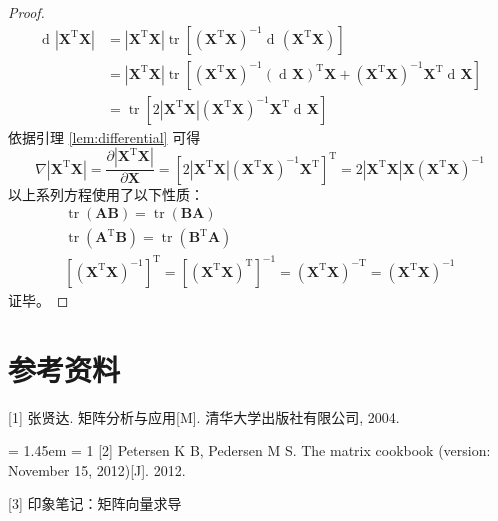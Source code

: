 \documentclass[UTF8,space=auto]{ctexart} %
\DeclareMathOperator{\diff}{d\!}
\begin{document}
\begin{proof}
\begin{align*}
	\diff \left| \mathbf{X}^{\mathrm{T}}\mathbf{X} \right|
	&= \left| \mathbf{X}^{\mathrm{T}}\mathbf{X} \right| \operatorname{tr} \left[ \left( \mathbf{X}^{\mathrm{T}}\mathbf{X} \right)^{-1} \diff\left( \mathbf{X}^{\mathrm{T}}\mathbf{X} \right) \right] \\
	&= \left| \mathbf{X}^{\mathrm{T}}\mathbf{X} \right| \operatorname{tr} \left[ \left( \mathbf{X}^{\mathrm{T}}\mathbf{X} \right)^{-1} \left(\diff\mathbf{X}\right)^{\mathrm{T}} \mathbf{X} + \left( \mathbf{X}^{\mathrm{T}}\mathbf{X} \right)^{-1} \mathbf{X}^{\mathrm{T}} \diff\mathbf{X} \right] \\
	&= \operatorname{tr} \left[ 2\left| \mathbf{X}^{\mathrm{T}}\mathbf{X} \right| \left( \mathbf{X}^{\mathrm{T}}\mathbf{X} \right)^{-1} \mathbf{X}^{\mathrm{T}} \diff\mathbf{X} \right]
\end{align*}
依据引理 \ref{lem:differential} 可得
\[
\nabla \left| \mathbf{X}^{\mathrm{T}}\mathbf{X} \right|
= \frac{\partial\left|\mathbf{X}^{\mathrm{T}} \mathbf{X}\right|}{\partial \mathbf{X}}
= \left[ 2\left| \mathbf{X}^{\mathrm{T}}\mathbf{X} \right| \left( \mathbf{X}^{\mathrm{T}}\mathbf{X} \right)^{-1} \mathbf{X}^{\mathrm{T}} \right]^{\mathrm{T}}
=2\left|\mathbf{X}^{\mathrm{T}} \mathbf{X}\right| \mathbf{X}\left(\mathbf{X}^{\mathrm{T}} \mathbf{X}\right)^{-1}
\]
以上系列方程使用了以下性质：
\begin{gather*}
\operatorname{tr}(\mathbf{AB})=\operatorname{tr}(\mathbf{BA}) \\
\operatorname{tr}\left(\mathbf{A}^{\mathrm{T}} \mathbf{B}\right)=\operatorname{tr}\left(\mathbf{B}^{\mathrm{T}} \mathbf{A}\right) \\
\left[\left( \mathbf{X}^{\mathrm{T}}\mathbf{X} \right)^{-1}\right]^{\mathrm{T}}=\left[\left(\mathbf{X}^{\mathrm{T}}\mathbf{X}\right)^{\mathrm{T}}\right]^{-1}= \left(\mathbf{X}^{\mathrm{T}}\mathbf{X}\right)^{-\mathrm{T}} =\left(\mathbf{X}^{\mathrm{T}}\mathbf{X}\right)^{-1}
\end{gather*}
证毕。
\end{proof}


\section{参考资料}
\setlength{\parindent}{0em}
[1] 张贤达. 矩阵分析与应用[M]. 清华大学出版社有限公司, 2004.

\hangindent = 1.45em \hangafter = 1
[2] Petersen K B, Pedersen M S. The matrix cookbook (version: November 15, 2012)[J]. 2012.

[3] 印象笔记：矩阵向量求导
\end{document}
